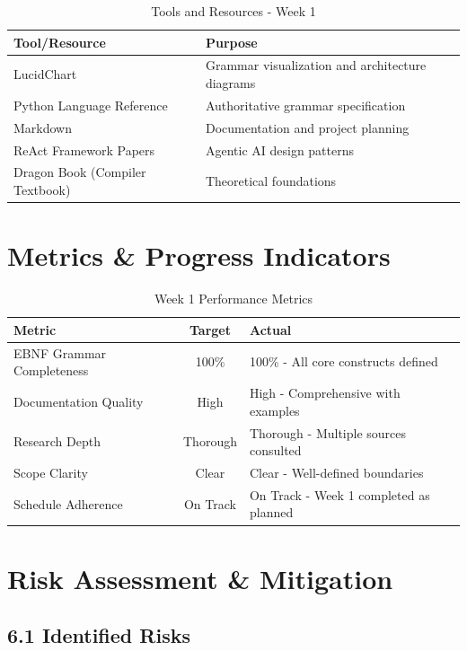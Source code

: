 \documentclass[a4paper,11pt]{article}
\begin{document}
\begin{table}[h]
\centering
\begin{tabularx}{\textwidth}{|l|X|}
\hline
\rowcolor{blue!10}
\textbf{Tool/Resource} & \textbf{Purpose} \\
\hline
LucidChart & Grammar visualization and architecture diagrams \\
\hline
Python Language Reference & Authoritative grammar specification \\
\hline
Markdown & Documentation and project planning \\
\hline
ReAct Framework Papers & Agentic AI design patterns \\
\hline
Dragon Book (Compiler Textbook) & Theoretical foundations \\
\hline
\end{tabularx}
\caption{Tools and Resources - Week 1}
\end{table}

\section{Metrics \& Progress Indicators}

\begin{table}[h]
\centering
\begin{tabularx}{\textwidth}{|l|c|X|}
\hline
\rowcolor{blue!10}
\textbf{Metric} & \textbf{Target} & \textbf{Actual} \\
\hline
EBNF Grammar Completeness & 100\% & 100\% - All core constructs defined \\
\hline
Documentation Quality & High & High - Comprehensive with examples \\
\hline
Research Depth & Thorough & Thorough - Multiple sources consulted \\
\hline
Scope Clarity & Clear & Clear - Well-defined boundaries \\
\hline
Schedule Adherence & On Track & On Track - Week 1 completed as planned \\
\hline
\end{tabularx}
\caption{Week 1 Performance Metrics}
\end{table}

\section{Risk Assessment \& Mitigation}

\subsection{6.1 Identified Risks}
\end{document}
